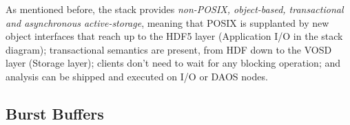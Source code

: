 \documentclass[conference]{IEEEtran}
\begin{document}
%
%

As mentioned before, the stack provides \emph{non-POSIX, object-based,
transactional and asynchronous active-storage}, meaning that POSIX is
supplanted by new object interfaces that reach up to the HDF5 layer
(Application I/O in the stack diagram); transactional semantics are present,
from HDF down to the VOSD layer (Storage layer); clients don't need to wait for
any blocking operation; and analysis can be shipped and executed on I/O or DAOS
nodes.

\subsection{Burst Buffers}
\label{sec:burst}
\end{document}
